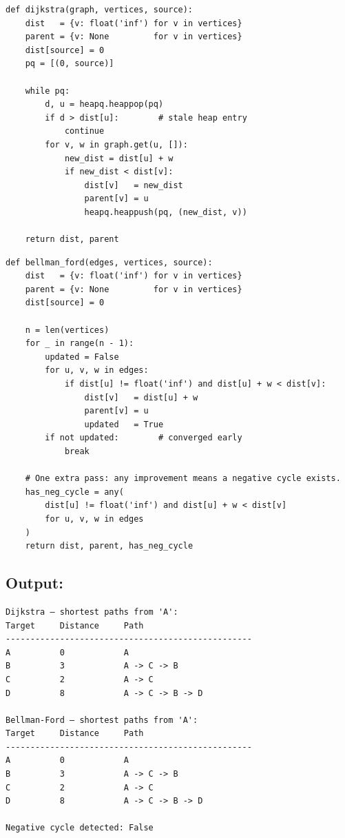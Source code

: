 \documentclass[11pt,a4paper]{article}
\begin{document}
\begin{lstlisting}[style=python, caption={Dijkstra's algorithm (src/b3\_shortest\_paths.py).}]
def dijkstra(graph, vertices, source):
    dist   = {v: float('inf') for v in vertices}
    parent = {v: None         for v in vertices}
    dist[source] = 0
    pq = [(0, source)]

    while pq:
        d, u = heapq.heappop(pq)
        if d > dist[u]:        # stale heap entry
            continue
        for v, w in graph.get(u, []):
            new_dist = dist[u] + w
            if new_dist < dist[v]:
                dist[v]   = new_dist
                parent[v] = u
                heapq.heappush(pq, (new_dist, v))

    return dist, parent
\end{lstlisting}

\begin{lstlisting}[style=python, caption={Bellman-Ford algorithm (src/b3\_shortest\_paths.py).}]
def bellman_ford(edges, vertices, source):
    dist   = {v: float('inf') for v in vertices}
    parent = {v: None         for v in vertices}
    dist[source] = 0

    n = len(vertices)
    for _ in range(n - 1):
        updated = False
        for u, v, w in edges:
            if dist[u] != float('inf') and dist[u] + w < dist[v]:
                dist[v]   = dist[u] + w
                parent[v] = u
                updated   = True
        if not updated:        # converged early
            break

    # One extra pass: any improvement means a negative cycle exists.
    has_neg_cycle = any(
        dist[u] != float('inf') and dist[u] + w < dist[v]
        for u, v, w in edges
    )
    return dist, parent, has_neg_cycle
\end{lstlisting}

\subsection{Output:}
\begin{lstlisting}[style=output]
Dijkstra – shortest paths from 'A':
Target     Distance     Path
--------------------------------------------------
A          0            A
B          3            A -> C -> B
C          2            A -> C
D          8            A -> C -> B -> D

Bellman-Ford – shortest paths from 'A':
Target     Distance     Path
--------------------------------------------------
A          0            A
B          3            A -> C -> B
C          2            A -> C
D          8            A -> C -> B -> D

Negative cycle detected: False
\end{lstlisting}
\end{document}

